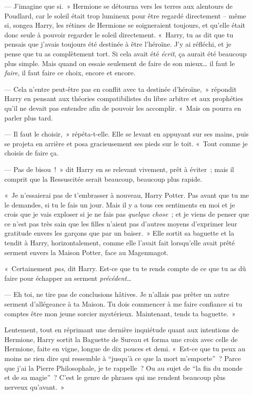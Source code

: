 --- J'imagine que si.~»
Hermione se détourna vers les terres aux alentours de Poudlard, car le soleil était trop lumineux pour être regardé directement -- même si, songea Harry, les rétines de Hermione se soigneraient toujours, et qu'elle était donc seule à pouvoir regarder le soleil directement.
«~Harry, tu as dit que tu pensais que j'avais toujours été destinée à être l'héroïne.
J'y ai réfléchi, et je pense que tu as complètement tort.
Si cela avait été \emph{écrit}, ça aurait été beaucoup plus simple.
Mais quand on essaie seulement de faire de son mieux… il faut le \emph{faire}, il faut faire ce choix, encore et encore.

--- Cela n'entre peut-être pas en conflit avec ta destinée d'héroïne,~» répondit Harry en pensant aux théories compatibilistes du libre arbitre et aux prophéties qu'il ne devait pas entendre afin de pouvoir les accomplir.
«~Mais on pourra en parler plus tard.

--- Il faut le choisir,~» répéta-t-elle.
Elle se levant en appuyant sur ses mains, puis se projeta en arrière et posa gracieusement ses pieds sur le toit.
«~Tout comme je choisis de faire ça.

--- Pas de bisou~!~»
dit Harry en se relevant vivement, prêt à éviter~; mais il comprit que la Ressuscitée serait beaucoup, beaucoup plus rapide.

«~Je n'essaierai pas de t'embrasser à nouveau, Harry Potter.
Pas avant que tu me le demandes, si tu le fais un jour.
Mais il y a tous ces sentiments en moi et je crois que je vais exploser si je ne fais pas \emph{quelque chose}~; et je viens de penser que ce n'est pas très sain que les filles n'aient pas d'autres moyens d'exprimer leur gratitude envers les garçons que par un baiser.~»
Elle sortit sa baguette et la tendit à Harry, horizontalement, comme elle l'avait fait lorsqu'elle avait prêté serment envers la Maison Potter, face au Magenmagot.

«~Certainement \emph{pas}, dit Harry.
Est-ce que tu te rends compte de ce que tu as dû faire pour échapper au serment \emph{précédent}…

--- Eh toi, ne tire pas de conclusions hâtives.
Je n'allais pas prêter un autre serment d'allégeance à ta Maison.
Tu dois commencer à me faire confiance si tu comptes être mon jeune sorcier mystérieux.
Maintenant, tends ta baguette.~»

Lentement, tout en réprimant une dernière inquiétude quant aux intentions de Hermione, Harry sortit la Baguette de Sureau et forma une croix avec celle de Hermione, faite en vigne, longue de dix pouces et demi.
«~Est-ce que tu peux au moins ne rien dire qui ressemble à “jusqu'à ce que la mort m'emporte”~?
Parce que j'ai la Pierre Philosophale, je te rappelle~?
Ou au sujet de “la fin du monde et de sa magie”~?
C'est le genre de phrases qui me rendent beaucoup plus nerveux qu'avant.~»

